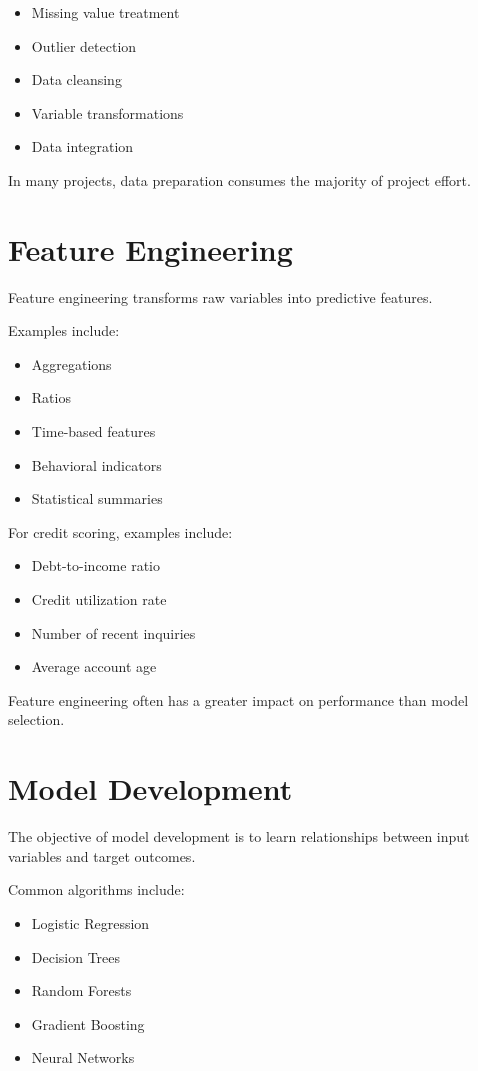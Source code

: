 \begin{itemize}
    \item Missing value treatment
    \item Outlier detection
    \item Data cleansing
    \item Variable transformations
    \item Data integration
\end{itemize}

In many projects, data preparation consumes the majority of project effort.

\section{Feature Engineering}

Feature engineering transforms raw variables into predictive features.

Examples include:

\begin{itemize}
    \item Aggregations
    \item Ratios
    \item Time-based features
    \item Behavioral indicators
    \item Statistical summaries
\end{itemize}

For credit scoring, examples include:

\begin{itemize}
    \item Debt-to-income ratio
    \item Credit utilization rate
    \item Number of recent inquiries
    \item Average account age
\end{itemize}

Feature engineering often has a greater impact on performance than model selection.

\section{Model Development}

The objective of model development is to learn relationships between input variables and target outcomes.

Common algorithms include:

\begin{itemize}
    \item Logistic Regression
    \item Decision Trees
    \item Random Forests
    \item Gradient Boosting
    \item Neural Networks
\end{itemize}

